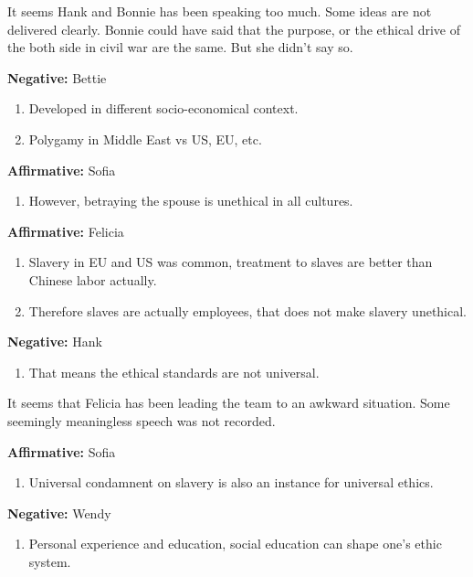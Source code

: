 \documentclass[12pt]{article}
\newcommand{\affirmative}[1]{{\color{affirmcolor}\textbf{Affirmative:} #1}}
\newcommand{\negative}[1]{{\color{negcolor}\textbf{Negative:} #1}}
\begin{document}
\begin{tcolorbox}[title = Note]
    It seems Hank and Bonnie has been speaking too much. 
    Some ideas are not delivered clearly. 
    Bonnie could have said that the purpose, or the ethical drive of the both side in civil war are the same. But she didn't say so.
\end{tcolorbox}

\negative{Bettie
\begin{enumerate}
    \item Developed in different socio-economical context.
    \item Polygamy in Middle East vs US, EU, etc.
\end{enumerate}
}

\affirmative{Sofia
\begin{enumerate}
    \item However, betraying the spouse is unethical in all cultures.
\end{enumerate}
}

\affirmative{Felicia
\begin{enumerate}
    \item Slavery in EU and US was common, treatment to slaves are better than Chinese labor actually.
    \item Therefore slaves are actually employees, that does not make slavery unethical.
\end{enumerate}
}

\negative{Hank
\begin{enumerate}
    \item That means the ethical standards are not universal.
\end{enumerate}
}

\begin{tcolorbox}[title = Note]
    It seems that Felicia has been leading the team to an awkward situation. Some seemingly meaningless speech was not recorded. 
\end{tcolorbox}

\affirmative{Sofia
\begin{enumerate}
    \item Universal condamnent on slavery is also an instance for universal ethics.
\end{enumerate}
}

\negative{Wendy
\begin{enumerate}
    \item Personal experience and education, social education can shape one's ethic system.
\end{enumerate}
}
\end{document}
